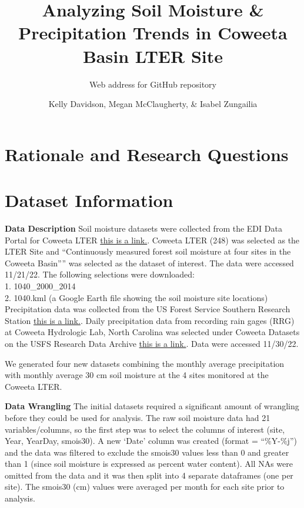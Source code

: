 \documentclass[
  12pt,
]{article}
\title{Analyzing Soil Moisture \& Precipitation Trends in Coweeta Basin
LTER Site}
\subtitle{Web address for GitHub repository}
\author{Kelly Davidson, Megan McClaugherty, \& Isabel Zungailia}
\date{}
\begin{document}
\maketitle

\newpage
\tableofcontents 
\newpage
\listoftables 
\newpage
\listoffigures 
\newpage

\hypertarget{rationale-and-research-questions}{%
\section{Rationale and Research
Questions}\label{rationale-and-research-questions}}

\newpage

\hypertarget{dataset-information}{%
\section{Dataset Information}\label{dataset-information}}

\textbf{Data Description} Soil moisture datasets were collected from the
EDI Data Portal for Coweeta LTER
\href{https://portal.edirepository.org/nis/home.jsp}{this is a link.}.
Coweeta LTER (248) was selected as the LTER Site and ``Continuously
measured forest soil moisture at four sites in the Coweeta Basin'''' was
selected as the dataset of interest. The data were accessed 11/21/22.
The following selections were downloaded:\\
1. 1040\_2000\_2014\\
2. 1040.kml (a Google Earth file showing the soil moisture site
locations)\\
Precipitation data was collected from the US Forest Service Southern
Research Station
\href{https://www.srs.fs.usda.gov/coweeta/tools-and-data/}{this is a
link.}. Daily precipitation data from recording rain gages (RRG) at
Coweeta Hydrologic Lab, North Carolina was selected under Coweeta
Datasets on the USFS Research Data Archive
\href{https://www.fs.usda.gov/rds/archive/Catalog/RDS-2017-0031}{this is
a link.}. Data were accessed 11/30/22.

We generated four new datasets combining the monthly average
precipitation with monthly average 30 cm soil moisture at the 4 sites
monitored at the Coweeta LTER.

\textbf{Data Wrangling} The initial datasets required a significant
amount of wrangling before they could be used for analysis. The raw soil
moisture data had 21 variables/columns, so the first step was to select
the columns of interest (site, Year, YearDay, smois30). A new `Date'
column was created (format = ``\%Y-\%j'') and the data was filtered to
exclude the smois30 values less than 0 and greater than 1 (since soil
moisture is expressed as percent water content). All NAs were omitted
from the data and it was then split into 4 separate dataframes (one per
site). The smois30 (cm) values were averaged per month for each site
prior to analysis.
\end{document}
